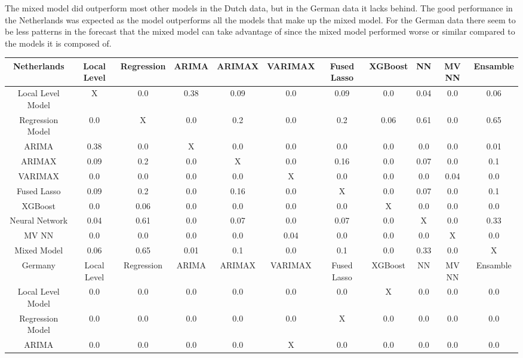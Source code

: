 The mixed model did outperform most other models in the Dutch data, but in the German data it lacks behind. The good performance in the Netherlands was expected as the model outperforms all the models that make up the mixed model. For the German data there seem to be less patterns in the forecast that the mixed model can take advantage of since the mixed model performed worse or similar compared to the models it is composed of.\\

\begin{landscape}
\pagestyle{empty}
\begin{table}[]
    \centering
    \begin{tabular}{|c|c c c c c c c c c c|}\hline
        Netherlands &  Local Level & Regression & ARIMA & ARIMAX & VARIMAX & Fused Lasso & XGBoost & NN & MV NN & Ensamble\\\hline
        Local Level Model & X & 0.0 & 0.38 & 0.09 & 0.0 & 0.09 & 0.0 & 0.04 & 0.0 & 0.06\\
        Regression Model & 0.0 & X & 0.0 & 0.2 & 0.0 & 0.2 & 0.06 & 0.61 & 0.0 & 0.65\\
        ARIMA & 0.38 & 0.0 & X & 0.0 & 0.0 & 0.0 & 0.0 & 0.0 & 0.0 & 0.01\\
        ARIMAX & 0.09 & 0.2 & 0.0 & X & 0.0 & 0.16 & 0.0 & 0.07 & 0.0 & 0.1\\
        VARIMAX & 0.0 & 0.0 & 0.0 & 0.0 & X & 0.0 & 0.0 & 0.0 & 0.04 & 0.0\\
        Fused Lasso & 0.09 & 0.2 & 0.0 & 0.16 & 0.0 & X & 0.0 & 0.07 & 0.0 & 0.1\\
        XGBoost & 0.0 & 0.06 & 0.0 & 0.0 & 0.0 & 0.0 & X & 0.0 & 0.0 & 0.0\\
        Neural Network & 0.04 & 0.61 & 0.0 & 0.07 & 0.0 & 0.07 & 0.0 & X & 0.0 & 0.33\\
        MV NN & 0.0 & 0.0 & 0.0 & 0.0 & 0.04 & 0.0 & 0.0 & 0.0 & X & 0.0\\
        Mixed Model & 0.06 & 0.65 & 0.01 & 0.1 & 0.0 & 0.1 & 0.0 & 0.33 & 0.0 & X\\
        \hline\hline
        Germany &  Local Level & Regression & ARIMA & ARIMAX & VARIMAX & Fused Lasso & XGBoost & NN & MV NN & Ensamble\\\hline
        Local Level Model & 0.0 & 0.0 & 0.0 & 0.0 & 0.0 & 0.0 & X & 0.0 & 0.0 & 0.0\\
        Regression Model & 0.0 & 0.0 & 0.0 & 0.0 & 0.0 & X & 0.0 & 0.0 & 0.0 & 0.0\\
        ARIMA & 0.0 & 0.0 & 0.0 & 0.0 & X & 0.0 & 0.0 & 0.0 & 0.0 & 0.0\\

\end{tabular}
\end{table}
\end{landscape}
